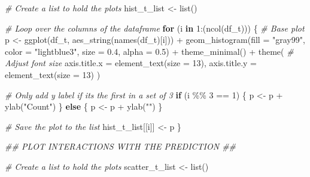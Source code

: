 \documentclass[
  11pt,
]{article}
\newenvironment{Shaded}{}{}
\newcommand{\AttributeTok}[1]{\textcolor[rgb]{0.49,0.56,0.16}{#1}}
\newcommand{\CommentTok}[1]{\textcolor[rgb]{0.38,0.63,0.69}{\textit{#1}}}
\newcommand{\ControlFlowTok}[1]{\textcolor[rgb]{0.00,0.44,0.13}{\textbf{#1}}}
\newcommand{\DecValTok}[1]{\textcolor[rgb]{0.25,0.63,0.44}{#1}}
\newcommand{\DocumentationTok}[1]{\textcolor[rgb]{0.73,0.13,0.13}{\textit{#1}}}
\newcommand{\FloatTok}[1]{\textcolor[rgb]{0.25,0.63,0.44}{#1}}
\newcommand{\FunctionTok}[1]{\textcolor[rgb]{0.02,0.16,0.49}{#1}}
\newcommand{\NormalTok}[1]{#1}
\newcommand{\OtherTok}[1]{\textcolor[rgb]{0.00,0.44,0.13}{#1}}
\newcommand{\SpecialCharTok}[1]{\textcolor[rgb]{0.25,0.44,0.63}{#1}}
\newcommand{\StringTok}[1]{\textcolor[rgb]{0.25,0.44,0.63}{#1}}
\begin{document}
\begin{Shaded}
\begin{Highlighting}[]
\CommentTok{\# Create a list to hold the plots}
\NormalTok{hist\_t\_list }\OtherTok{\textless{}{-}} \FunctionTok{list}\NormalTok{()}

\CommentTok{\# Loop over the columns of the dataframe}
\ControlFlowTok{for}\NormalTok{ (i }\ControlFlowTok{in} \DecValTok{1}\SpecialCharTok{:}\NormalTok{(}\FunctionTok{ncol}\NormalTok{(df\_t))) \{}
  \CommentTok{\# Base plot}
\NormalTok{  p }\OtherTok{\textless{}{-}} \FunctionTok{ggplot}\NormalTok{(df\_t, }\FunctionTok{aes\_string}\NormalTok{(}\FunctionTok{names}\NormalTok{(df\_t)[i])) }\SpecialCharTok{+} 
    \FunctionTok{geom\_histogram}\NormalTok{(}\AttributeTok{fill =} \StringTok{"gray99"}\NormalTok{, }\AttributeTok{color =} \StringTok{"lightblue3"}\NormalTok{, }\AttributeTok{size =} \FloatTok{0.4}\NormalTok{, }\AttributeTok{alpha =} \FloatTok{0.5}\NormalTok{) }\SpecialCharTok{+}
    \FunctionTok{theme\_minimal}\NormalTok{() }\SpecialCharTok{+}
    \FunctionTok{theme}\NormalTok{(}
      \CommentTok{\# Adjust font size}
      \AttributeTok{axis.title.x =} \FunctionTok{element\_text}\NormalTok{(}\AttributeTok{size =} \DecValTok{13}\NormalTok{),  }
      \AttributeTok{axis.title.y =} \FunctionTok{element\_text}\NormalTok{(}\AttributeTok{size =} \DecValTok{13}\NormalTok{)   }
\NormalTok{    )}
  
  \CommentTok{\# Only add y label if it\textquotesingle{}s the first in a set of 3}
  \ControlFlowTok{if}\NormalTok{ (i }\SpecialCharTok{\%\%} \DecValTok{3} \SpecialCharTok{==} \DecValTok{1}\NormalTok{) \{}
\NormalTok{    p }\OtherTok{\textless{}{-}}\NormalTok{ p }\SpecialCharTok{+} \FunctionTok{ylab}\NormalTok{(}\StringTok{"Count"}\NormalTok{)}
\NormalTok{  \} }\ControlFlowTok{else}\NormalTok{ \{}
\NormalTok{    p }\OtherTok{\textless{}{-}}\NormalTok{ p }\SpecialCharTok{+} \FunctionTok{ylab}\NormalTok{(}\StringTok{""}\NormalTok{)}
\NormalTok{  \}}
  
  \CommentTok{\# Save the plot to the list}
\NormalTok{  hist\_t\_list[[i]] }\OtherTok{\textless{}{-}}\NormalTok{ p}
\NormalTok{\}}



\DocumentationTok{\#\# PLOT INTERACTIONS WITH THE PREDICTION \#\#}

\CommentTok{\# Create a list to hold the plots}
\NormalTok{scatter\_t\_list }\OtherTok{\textless{}{-}} \FunctionTok{list}\NormalTok{()}


\end{Highlighting}
\end{Shaded}
\end{document}
